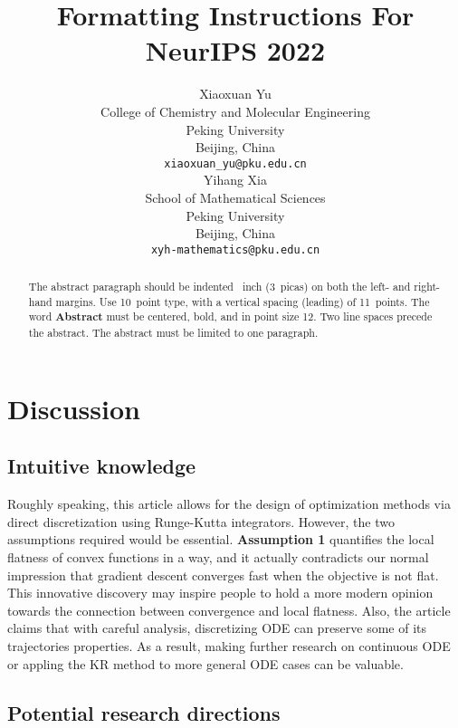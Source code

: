 \documentclass{article}
\title{Formatting Instructions For NeurIPS 2022}
\author{%
  Xiaoxuan Yu \\
  College of Chemistry and Molecular Engineering\\
  Peking University\\
  Beijing, China \\
  \texttt{xiaoxuan\_yu@pku.edu.cn} \\
  \And
  Yihang Xia \\
  School of Mathematical Sciences \\
  Peking University \\
  Beijing, China\\
  \texttt{xyh-mathematics@pku.edu.cn} \\
}
\begin{document}
\maketitle


\begin{abstract}
  The abstract paragraph should be indented ~inch (3~picas) on
  both the left- and right-hand margins. Use 10~point type, with a vertical
  spacing (leading) of 11~points.  The word \textbf{Abstract} must be centered,
  bold, and in point size 12. Two line spaces precede the abstract. The abstract
  must be limited to one paragraph.
\end{abstract}



\section{Discussion}

\subsection{Intuitive knowledge}

Roughly speaking, this article allows for the design of optimization
methods via direct discretization using Runge-Kutta integrators. However, the two
assumptions required would be essential. \textbf{Assumption 1} quantifies the local flatness
of convex functions in a way, and it actually contradicts our normal impression that
gradient descent converges fast when the objective is not flat. This innovative discovery
may inspire people to hold a more modern opinion towards the connection between
convergence and local flatness. Also, the article claims that with careful
analysis, discretizing ODE can preserve some of its trajectories properties.
As a result, making further research on continuous ODE or appling the KR method to
more general ODE cases can be valuable.

\subsection{Potential research directions}
\end{document}
